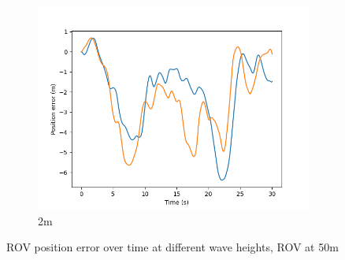 \documentclass[class=article, crop=false]{standalone}
\begin{document}
\begin{figure}
\begin{subfigure}[b]{0.48\textwidth}
        \includegraphics{scenario1/rov-50m/2.0m/rov_position_error_controlled}
        \caption{2m}
        \label{}
    \end{subfigure}

    \caption{ROV position error over time at different wave heights, ROV at 50m}
\end{figure}
\end{document}
